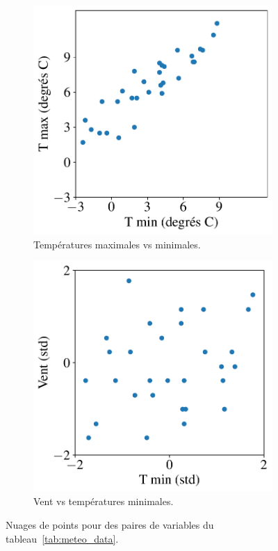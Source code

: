 \begin{figure}[h]
  \centering
  \begin{subfigure}[t]{0.49\textwidth}
    \centering
    \includegraphics[width=.7\textwidth]{figures/stats/meteo_tmin_tmax}
    \caption{Températures maximales vs minimales.}
    \label{fig:meteo_tmin_tmax}
  \end{subfigure} \hfill
  \begin{subfigure}[t]{0.49\textwidth}
    \centering
    \includegraphics[width=.7\textwidth]{figures/stats/meteo_tmin_vent}
    \caption{Vent vs températures minimales.}
    \label{fig:meteo_tmin_vent}
  \end{subfigure}
  \caption{Nuages de points pour des paires de variables du
    tableau~\ref{tab:meteo_data}.}
\end{figure}


